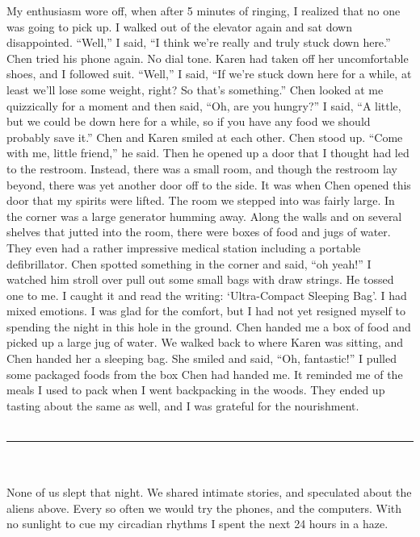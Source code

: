 \documentclass[a4paper]{article}
\begin{document}
My enthusiasm wore off, when after 5 minutes of ringing, I realized that no one was going to pick up. I walked out of the elevator again and sat down disappointed. “Well,” I said, “I think we’re really and truly stuck down here.”
Chen tried his phone again. No dial tone.
Karen had taken off her uncomfortable shoes, and I followed suit. “Well,” I said, “If we’re stuck down here for a while, at least we’ll lose some weight, right? So that’s something.”
Chen looked at me quizzically for a moment and then said, “Oh, are you hungry?”
I said, “A little, but we could be down here for a while, so if you have any food we should probably save it.”
Chen and Karen smiled at each other. Chen stood up. “Come with me, little friend,” he said. Then he opened up a door that I thought had led to the restroom.
Instead, there was a small room, and though the restroom lay beyond, there was yet another door off to the side. It was when Chen opened this door that my spirits were lifted.
The room we stepped into was fairly large. In the corner was a large generator humming away. Along the walls and on several shelves that jutted into the room, there were boxes of food and jugs of water. They even had a rather impressive medical station including a portable defibrillator.
Chen spotted something in the corner and said, “oh yeah!”
I watched him stroll over pull out some small bags with draw strings. He tossed one to me. I caught it and read the writing: ‘Ultra-Compact Sleeping Bag’. I had mixed emotions. I was glad for the comfort, but I had not yet resigned myself to spending the night in this hole in the ground.
Chen handed me a box of food and picked up a large jug of water. We walked back to where Karen was sitting, and Chen handed her a sleeping bag. She smiled and said, “Oh, fantastic!”
I pulled some packaged foods from the box Chen had handed me. It reminded me of the meals I used to pack when I went backpacking in the woods. They ended up tasting about the same as well, and I was grateful for the nourishment. \\ \\
\hrule ~ \\ \\

None of us slept that night. We shared intimate stories, and speculated about the aliens above. Every so often we would try the phones, and the computers. With no sunlight to cue my circadian rhythms I spent the next 24 hours in a haze.
\end{document}
